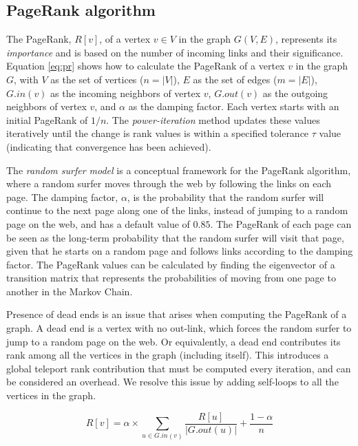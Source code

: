\subsection{PageRank algorithm}
\label{sec:pagerank}

The PageRank, $R[v]$, of a vertex $v \in V$ in the graph $G(V, E)$, represents its \textit{importance} and is based on the number of incoming links and their significance. Equation \ref{eq:pr} shows how to calculate the PageRank of a vertex $v$ in the graph $G$, with $V$ as the set of vertices ($n = |V|$), $E$ as the set of edges ($m = |E|$), $G.in(v)$ as the incoming neighbors of vertex $v$, $G.out(v)$ as the outgoing neighbors of vertex $v$, and $\alpha$ as the damping factor. Each vertex starts with an initial PageRank of $1/n$. The \textit{power-iteration} method updates these values iteratively until the change is rank values is within a specified tolerance $\tau$ value (indicating that convergence has been achieved).

The \textit{random surfer model} is a conceptual framework for the PageRank algorithm, where a random surfer moves through the web by following the links on each page. The damping factor, $\alpha$, is the probability that the random surfer will continue to the next page along one of the links, instead of jumping to a random page on the web, and has a default value of $0.85$. The PageRank of each page can be seen as the long-term probability that the random surfer will visit that page, given that he starts on a random page and follows links according to the damping factor. The PageRank values can be calculated by finding the eigenvector of a transition matrix that represents the probabilities of moving from one page to another in the Markov Chain.

Presence of dead ends is an issue that arises when computing the PageRank of a graph. A dead end is a vertex with no out-link, which forces the random surfer to jump to a random page on the web. Or equivalently, a dead end contributes its rank among all the vertices in the graph (including itself). This introduces a global teleport rank contribution that must be computed every iteration, and can be considered an overhead. We resolve this issue by adding self-loops to all the vertices in the graph.

\begin{equation}
\label{eq:pr}
    R[v] = \alpha \times \sum_{u \in G.in(v)} \frac{R[u]}{|G.out(u)|} + \frac{1 - \alpha}{n}
\end{equation}




